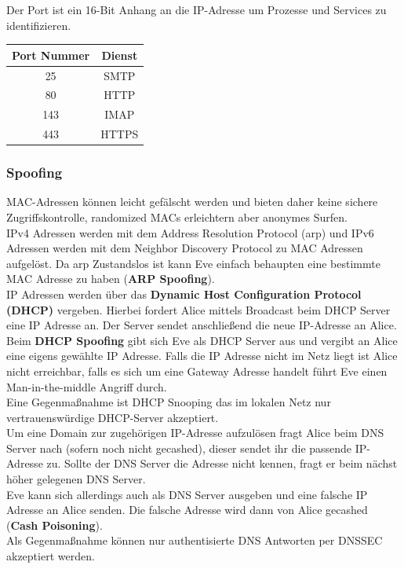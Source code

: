 \documentclass[a4paper,12pt,leqno]{article}
\begin{document}
Der Port ist ein 16-Bit Anhang an die IP-Adresse um Prozesse und Services zu identifizieren.\\

\begin{tabular}{|c|c|}
\hline
Port Nummer & Dienst\\
\hline
25 & SMTP\\
80 & HTTP\\
143 & IMAP\\
443 & HTTPS\\
\hline
\end{tabular}

\subsubsection{Spoofing}

\label{txt:spoofing}
MAC-Adressen können leicht gefälscht werden und bieten daher keine sichere Zugriffskontrolle, randomized MACs erleichtern aber anonymes Surfen.\\
IPv4 Adressen werden mit dem Address Resolution Protocol (arp) und IPv6 Adressen werden mit dem Neighbor Discovery Protocol zu MAC Adressen aufgelöst. Da arp Zustandslos ist kann Eve einfach behaupten eine bestimmte MAC Adresse zu haben (\textbf{ARP Spoofing}).\\

IP Adressen werden über das \textbf{Dynamic Host Configuration Protocol (DHCP)} vergeben. Hierbei fordert Alice mittels Broadcast beim DHCP Server eine IP Adresse an. Der Server sendet anschließend die neue IP-Adresse an Alice.\\
Beim \textbf{DHCP Spoofing} gibt sich Eve als DHCP Server aus und vergibt an Alice eine eigens gewählte IP Adresse. Falls die IP Adresse nicht im Netz liegt ist Alice nicht erreichbar, falls es sich um eine Gateway Adresse handelt führt Eve einen Man-in-the-middle Angriff durch.\\
Eine Gegenmaßnahme ist DHCP Snooping das im lokalen Netz nur vertrauenswürdige DHCP-Server akzeptiert.\\

Um eine Domain zur zugehörigen IP-Adresse aufzulösen fragt Alice beim DNS Server nach (sofern noch nicht gecashed), dieser sendet ihr die passende IP-Adresse zu. Sollte der DNS Server die Adresse nicht kennen, fragt er beim nächst höher gelegenen DNS Server.\\
Eve kann sich allerdings auch als DNS Server ausgeben und eine falsche IP Adresse an Alice senden.
Die falsche Adresse wird dann von Alice gecashed (\textbf{Cash Poisoning}).\\
Als Gegenmaßnahme können nur authentisierte DNS Antworten per DNSSEC akzeptiert werden.
\end{document}
